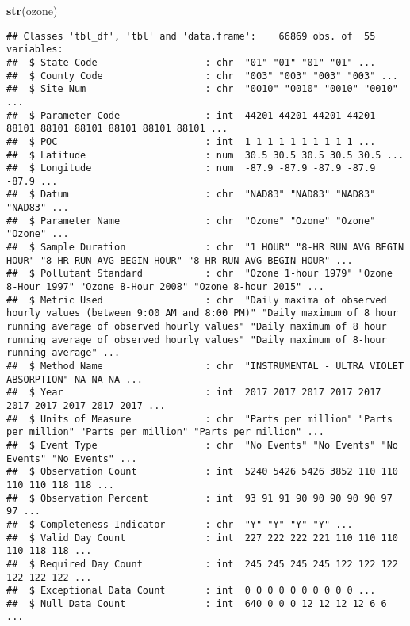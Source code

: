\documentclass[]{article}
\newenvironment{Shaded}{\begin{snugshade}}{\end{snugshade}}
\newcommand{\KeywordTok}[1]{\textcolor[rgb]{0.13,0.29,0.53}{\textbf{#1}}}
\newcommand{\NormalTok}[1]{#1}
\begin{document}
\begin{Shaded}
\begin{Highlighting}[]
\KeywordTok{str}\NormalTok{(ozone)}
\end{Highlighting}
\end{Shaded}

\begin{verbatim}
## Classes 'tbl_df', 'tbl' and 'data.frame':    66869 obs. of  55 variables:
##  $ State Code                   : chr  "01" "01" "01" "01" ...
##  $ County Code                  : chr  "003" "003" "003" "003" ...
##  $ Site Num                     : chr  "0010" "0010" "0010" "0010" ...
##  $ Parameter Code               : int  44201 44201 44201 44201 88101 88101 88101 88101 88101 88101 ...
##  $ POC                          : int  1 1 1 1 1 1 1 1 1 1 ...
##  $ Latitude                     : num  30.5 30.5 30.5 30.5 30.5 ...
##  $ Longitude                    : num  -87.9 -87.9 -87.9 -87.9 -87.9 ...
##  $ Datum                        : chr  "NAD83" "NAD83" "NAD83" "NAD83" ...
##  $ Parameter Name               : chr  "Ozone" "Ozone" "Ozone" "Ozone" ...
##  $ Sample Duration              : chr  "1 HOUR" "8-HR RUN AVG BEGIN HOUR" "8-HR RUN AVG BEGIN HOUR" "8-HR RUN AVG BEGIN HOUR" ...
##  $ Pollutant Standard           : chr  "Ozone 1-hour 1979" "Ozone 8-Hour 1997" "Ozone 8-Hour 2008" "Ozone 8-hour 2015" ...
##  $ Metric Used                  : chr  "Daily maxima of observed hourly values (between 9:00 AM and 8:00 PM)" "Daily maximum of 8 hour running average of observed hourly values" "Daily maximum of 8 hour running average of observed hourly values" "Daily maximum of 8-hour running average" ...
##  $ Method Name                  : chr  "INSTRUMENTAL - ULTRA VIOLET ABSORPTION" NA NA NA ...
##  $ Year                         : int  2017 2017 2017 2017 2017 2017 2017 2017 2017 2017 ...
##  $ Units of Measure             : chr  "Parts per million" "Parts per million" "Parts per million" "Parts per million" ...
##  $ Event Type                   : chr  "No Events" "No Events" "No Events" "No Events" ...
##  $ Observation Count            : int  5240 5426 5426 3852 110 110 110 110 118 118 ...
##  $ Observation Percent          : int  93 91 91 90 90 90 90 90 97 97 ...
##  $ Completeness Indicator       : chr  "Y" "Y" "Y" "Y" ...
##  $ Valid Day Count              : int  227 222 222 221 110 110 110 110 118 118 ...
##  $ Required Day Count           : int  245 245 245 245 122 122 122 122 122 122 ...
##  $ Exceptional Data Count       : int  0 0 0 0 0 0 0 0 0 0 ...
##  $ Null Data Count              : int  640 0 0 0 12 12 12 12 6 6 ...

\end{verbatim}
\end{document}
